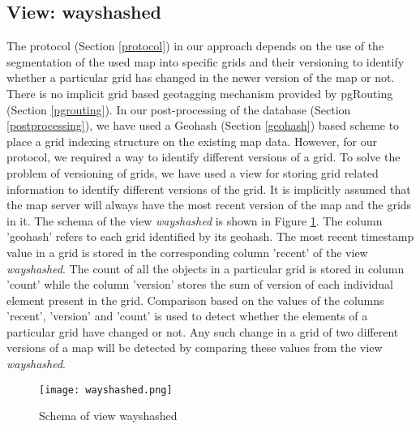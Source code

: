 


\subsection{View: wayshashed}
The protocol (Section \ref{protocol}) in our approach depends on the use of the segmentation of the used map into specific grids and their versioning to identify whether a particular grid has changed in the newer version of the map or not. There is no implicit grid based geotagging mechanism provided by pgRouting (Section \ref{pgrouting}). In our post-processing of the database (Section \ref{postprocessing}), we have used a Geohash (Section \ref{geohash}) based scheme to place a grid indexing structure on the existing map data. However, for our protocol, we required a way to identify different versions of a grid. To solve the problem of versioning of grids, we have used a view for storing grid related information to identify different versions of the grid. It is implicitly assumed that the map server will always have the most recent version of the map and the grids in it. The schema of the view \textit{wayshashed} is shown in Figure \ref{fg:wayshashed}. The column 'geohash' refers to each grid identified by its geohash. The most recent timestamp value in a grid is stored in the corresponding column 'recent' of the view \textit{wayshashed}. The count of all the objects in a particular grid is stored in column 'count' while the column 'version' stores the sum of version of each individual element present in the grid. Comparison based on the values of the columns 'recent', 'version' and 'count' is used to detect whether the elements of a particular grid have changed or not. Any such change in a grid of two different versions of a map will be detected by comparing these values from the view \textit{wayshashed}.
\begin{figure}
\texttt{[image: wayshashed.png]}
\caption{Schema of view wayshashed}
\label{fg:wayshashed}
\end{figure}



